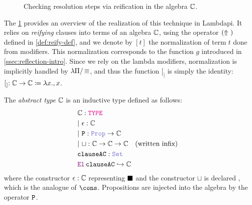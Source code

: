 \begin{figure}[t]
  \centering
  \caption{Checking resolution steps via reification in the algebra $\bb{C}$.}
  \label{fig:reflective-process}
\end{figure}

The \cref{fig:reflective-process} provides an overview of the realization of this technique in Lambdapi.
It relies on \emph{reifying} clauses into terms of an algebra $\bb{C}$, using the operator $\reify{}$ defined in \cref{def:reify-def},
and we denote by $[t]$ the normalization of term $t$ done from  modifiers.
This normalization corresponds to the function $g$ introduced in \cref{ssec:reflection-intro}.
Since we rely on the lambda modifiers, normalization is implicitly handled by $\lpm$, and thus the function $[_]$ is simply the identity: $[_]: \bb{C} \rightarrow \bb{C} \coloneq \lambda x., x$.

\begin{definition}
The \emph{abstract type} $\bb{C}$ is an inductive type defined as follows:
\begin{align*}
&\bb{C} : \type \\
&|~\eps: \bb{C} \\
&|~\kw{P}: \prop \ra \bb{C} \\
&|~\sqcup: \bb{C} \ra \bb{C} \ra \bb{C} \quad \text{(written infix)} \\
&\kw{clauseAC} : \set \\
&\el\, \kw{clauseAC} \re \bb{C} \\
\end{align*}
where the constructor $\eps: \bb{C}$ representing $\nil$ and the constructor $\sqcup$ is declared , which is the analogue of $\cons$.
Propositions are injected into the algebra by the operator $\tt{P}$.
\end{definition}

